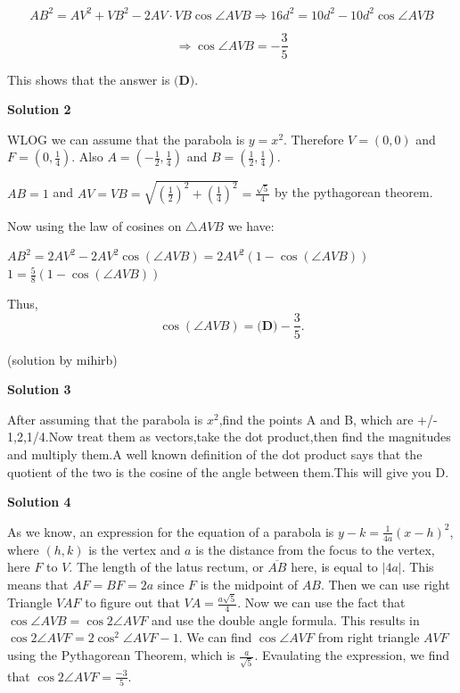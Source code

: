 \begin{enumerate}
 
 \[AB^2=AV^2+VB^2-2AV\cdot VB\cos{\angle AVB}\Rightarrow 16d^2=10d^2-10d^2\cos{\angle AVB}\]

 \[\Rightarrow \cos{\angle AVB}=-\frac{3}{5}\]

 This shows that the answer is $\boxed{\textbf{(D)}}$.

 


 



\textbf{Solution 2}

WLOG we can assume that the parabola is $y=x^2$. Therefore $V = (0,0)$ and $F = (0,\frac{1}{4})$. Also $A = (-\frac{1}{2},\frac{1}{4})$ and $B = (\frac{1}{2},\frac{1}{4})$.

 $AB = 1$ and $AV = VB = \sqrt{(\frac{1}{2})^2+(\frac{1}{4})^2} = \frac{\sqrt{5}}{4}$ by the pythagorean theorem.

 Now using the law of cosines on $\triangle AVB$ we have: 

 $AB^2 = 2AV^2-2AV^2\cos(\angle AVB) = 2AV^2(1-\cos(\angle AVB))$
$1 = \frac{5}{8} (1-\cos(\angle AVB))$

 Thus, 
 \[\cos(\angle AVB) = \boxed{\textbf{(D)} -\frac{3}{5}}.\]

 (solution by mihirb)

 



\textbf{Solution 3}

After assuming that the parabola is $x^2$,find the points A and B, which are +/- 1,2,1/4.Now treat them as vectors,take the dot product,then find the magnitudes and multiply them.A well known definition of the dot product says that the quotient of the two is the cosine of the angle between them.This will give you D.

 



\textbf{Solution 4}

As we know, an expression for the equation of a parabola is $y-k=\frac{1}{4a}(x-h)^2$, where $(h,k)$ is the vertex and $a$ is the distance from the focus to the vertex, here $F$ to $V$. The length of the latus rectum, or $\overline{AB}$ here, is equal to $|4a|$. This means that $AF=BF=2a$ since $F$ is the midpoint of $AB$. Then we can use right Triangle $VAF$ to figure out that $VA=\frac{a\sqrt{5}}{4}$. Now we can use the fact that $\cos{\angle AVB}=\cos{2 \angle AVF}$ and use the double angle formula. This results in $\cos{2 \angle AVF}=2{\cos}^2{\angle AVF}-1$. We can find $\cos{\angle AVF}$ from right triangle $AVF$ using the Pythagorean Theorem, which is $\frac{a}{\sqrt{5}}$. Evaulating the expression, we find that $\cos{2 \angle AVF}=\frac{-3}{5}$.


\end{enumerate}
